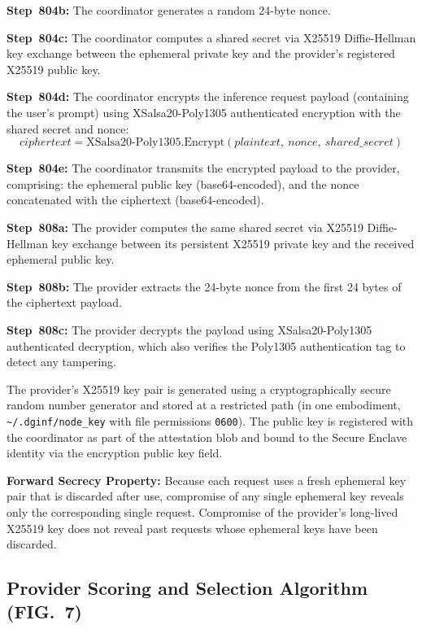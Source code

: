 \documentclass[11pt,letterpaper]{article}
\begin{document}
\textbf{Step~804b:} The coordinator generates a random 24-byte nonce.

\textbf{Step~804c:} The coordinator computes a shared secret via X25519 Diffie-Hellman key exchange between the ephemeral private key and the provider's registered X25519 public key.

\textbf{Step~804d:} The coordinator encrypts the inference request payload (containing the user's prompt) using XSalsa20-Poly1305 authenticated encryption with the shared secret and nonce:
$$\mathit{ciphertext} = \mathrm{XSalsa20\text{-}Poly1305}.\mathrm{Encrypt}(\mathit{plaintext},\ \mathit{nonce},\ \mathit{shared\_secret})$$

\textbf{Step~804e:} The coordinator transmits the encrypted payload to the provider, comprising: the ephemeral public key (base64-encoded), and the nonce concatenated with the ciphertext (base64-encoded).

\textbf{Step~808a:} The provider computes the same shared secret via X25519 Diffie-Hellman key exchange between its persistent X25519 private key and the received ephemeral public key.

\textbf{Step~808b:} The provider extracts the 24-byte nonce from the first 24 bytes of the ciphertext payload.

\textbf{Step~808c:} The provider decrypts the payload using XSalsa20-Poly1305 authenticated decryption, which also verifies the Poly1305 authentication tag to detect any tampering.

The provider's X25519 key pair is generated using a cryptographically secure random number generator and stored at a restricted path (in one embodiment, \texttt{\textasciitilde/.dginf/node\_key} with file permissions \texttt{0600}). The public key is registered with the coordinator as part of the attestation blob and bound to the Secure Enclave identity via the encryption public key field.

\textbf{Forward Secrecy Property:} Because each request uses a fresh ephemeral key pair that is discarded after use, compromise of any single ephemeral key reveals only the corresponding single request. Compromise of the provider's long-lived X25519 key does not reveal past requests whose ephemeral keys have been discarded.

\subsection{Provider Scoring and Selection Algorithm (FIG.~7)}
\end{document}

